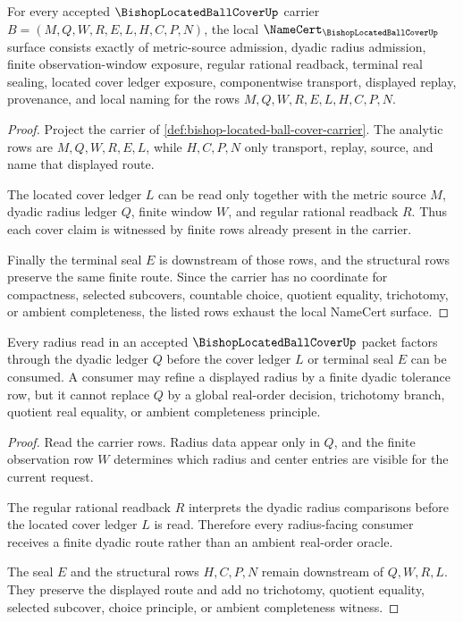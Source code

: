 \begin{theorem}
\label{thm:bishop-located-ball-cover-namecert-obligations}
For every accepted $\BishopLocatedBallCoverUp$ carrier $B=(M,Q,W,R,E,L,H,C,P,N)$, the local $\NameCert_{\BishopLocatedBallCoverUp}$ surface consists exactly of metric-source admission, dyadic radius admission, finite observation-window exposure, regular rational readback, terminal real sealing, located cover ledger exposure, componentwise transport, displayed replay, provenance, and local naming for the rows $M,Q,W,R,E,L,H,C,P,N$.
\end{theorem}
\begin{proof}
Project the carrier of \autoref{def:bishop-located-ball-cover-carrier}. The analytic rows are $M,Q,W,R,E,L$, while $H,C,P,N$ only transport, replay, source, and name that displayed route.

The located cover ledger $L$ can be read only together with the metric source $M$, dyadic radius ledger $Q$, finite window $W$, and regular rational readback $R$. Thus each cover claim is witnessed by finite rows already present in the carrier.

Finally the terminal seal $E$ is downstream of those rows, and the structural rows preserve the same finite route. Since the carrier has no coordinate for compactness, selected subcovers, countable choice, quotient equality, trichotomy, or ambient completeness, the listed rows exhaust the local NameCert surface.
\end{proof}

\begin{theorem}
\label{thm:bishop-located-ball-cover-radius-locality}
Every radius read in an accepted $\BishopLocatedBallCoverUp$ packet factors through the dyadic ledger $Q$ before the cover ledger $L$ or terminal seal $E$ can be consumed. A consumer may refine a displayed radius by a finite dyadic tolerance row, but it cannot replace $Q$ by a global real-order decision, trichotomy branch, quotient real equality, or ambient completeness principle.
\end{theorem}
\begin{proof}
Read the carrier rows. Radius data appear only in $Q$, and the finite observation row $W$ determines which radius and center entries are visible for the current request.

The regular rational readback $R$ interprets the dyadic radius comparisons before the located cover ledger $L$ is read. Therefore every radius-facing consumer receives a finite dyadic route rather than an ambient real-order oracle.

The seal $E$ and the structural rows $H,C,P,N$ remain downstream of $Q,W,R,L$. They preserve the displayed route and add no trichotomy, quotient equality, selected subcover, choice principle, or ambient completeness witness.
\end{proof}

